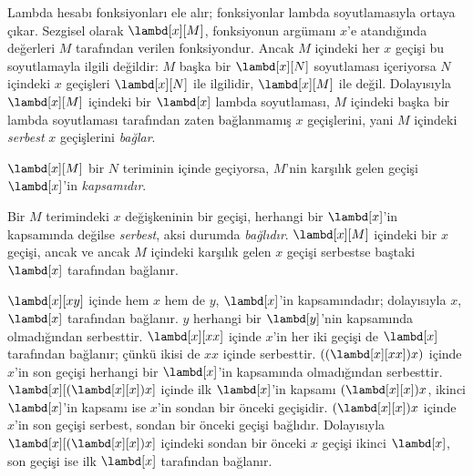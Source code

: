 


Lambda hesabı fonksiyonları ele alır; fonksiyonlar lambda soyutlamasıyla
ortaya çıkar. Sezgisel olarak $\lambd[x][M]$, fonksiyonun argümanı $x$'e
atandığında değerleri $M$ tarafından verilen fonksiyondur. Ancak $M$ içindeki
her $x$ geçişi bu soyutlamayla ilgili değildir: $M$ başka bir
$\lambd[x][N]$ soyutlaması içeriyorsa $N$ içindeki $x$ geçişleri
$\lambd[x][N]$ ile ilgilidir, $\lambd[x][M]$ ile değil. Dolayısıyla
$\lambd[x][M]$ içindeki bir $\lambd[x]$ lambda soyutlaması, $M$ içindeki
başka bir lambda soyutlaması tarafından zaten bağlanmamış $x$ geçişlerini,
yani $M$ içindeki \emph{serbest} $x$ geçişlerini \emph{bağlar}.

\begin{defn}[Kapsam]
$\lambd[x][M]$ bir $N$ teriminin içinde geçiyorsa, $M$'nin karşılık gelen
geçişi $\lambd[x]$'in \emph{kapsamıdır}.
\end{defn}


\begin{defn}
  Bir $M$ terimindeki $x$ değişkeninin bir geçişi, herhangi bir
  $\lambd[x]$'in kapsamında değilse \emph{serbest}, aksi durumda
  \emph{bağlıdır}. $\lambd[x][M]$ içindeki bir $x$ geçişi, ancak ve ancak
  $M$ içindeki karşılık gelen $x$ geçişi serbestse baştaki $\lambd[x]$
  tarafından bağlanır.
\end{defn}

\begin{ex}
  $\lambd[x][x y]$ içinde hem $x$ hem de $y$, $\lambd[x]$'in kapsamındadır;
  dolayısıyla $x$, $\lambd[x]$ tarafından bağlanır. $y$ herhangi bir
  $\lambd[y]$'nin kapsamında olmadığından serbesttir. $\lambd[x][x x]$
  içinde $x$'in her iki geçişi de $\lambd[x]$ tarafından bağlanır; çünkü
  ikisi de $xx$ içinde serbesttir. $((\lambd[x][xx])x)$ içinde $x$'in son
  geçişi herhangi bir $\lambd[x]$'in kapsamında olmadığından serbesttir.
  $\lambd[x][(\lambd[x][x])x]$ içinde ilk $\lambd[x]$'in kapsamı
  $(\lambd[x][x])x$, ikinci $\lambd[x]$'in kapsamı ise $x$'in sondan bir
  önceki geçişidir. $(\lambd[x][x])x$ içinde $x$'in son geçişi serbest,
  sondan bir önceki geçişi bağlıdır. Dolayısıyla
  $\lambd[x][(\lambd[x][x])x]$ içindeki sondan bir önceki $x$ geçişi ikinci
  $\lambd[x]$, son geçişi ise ilk $\lambd[x]$ tarafından bağlanır.
\end{ex}

